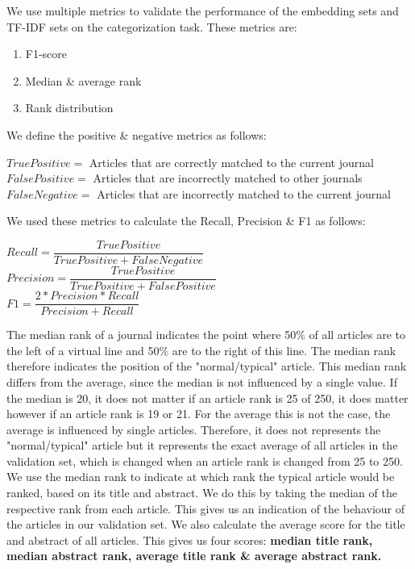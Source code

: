 \documentclass[../../Thesis.tex]{subfiles}
\begin{document}
We use multiple metrics to validate the performance of the embedding sets and TF-IDF sets on the categorization task. These metrics are:
\begin{enumerate}
\item{F1-score}
\item{Median \& average rank}
\item{Rank distribution}
\end{enumerate}
We define the positive \& negative metrics as follows:\\
\begin{jumpin}
$True Positive = $ Articles that are correctly matched to the current journal\\
$False Positive = $ Articles that are incorrectly matched to other journals\\
$False Negative = $ Articles that are incorrectly matched to the current journal\\
\end{jumpin}
We used these metrics to calculate the Recall, Precision \& F1 as follows:\\
\begin{jumpin}
$Recall = \dfrac{True Positive}{True Positive + False Negative}$\vspace{0.1in}\\
$Precision = \dfrac{True Positive}{True Positive + False Positive}$\vspace{0.1in}\\
$F1 = \dfrac{2 * Precision * Recall}{Precision + Recall}$
\end{jumpin}
The median rank of a journal indicates the point where 50\% of all articles are to the left of a virtual line and 50\% are to the right of this line. The median rank therefore indicates the position of the "normal/typical"  article. This median rank differs from the average, since the median is not influenced by a single value. If the median is 20, it does not matter if an article rank is 25 of 250, it does matter however if an article rank is 19 or 21. For the average this is not the case, the average is influenced by single articles. Therefore, it does not represents the "normal/typical" article but it represents the exact average of all articles in the validation set, which is changed when an article rank is changed from 25 to 250.\\
We use the median rank to indicate at which rank the typical article would be ranked, based on its title and abstract. We do this by taking the median of the respective rank from each article. This gives us an indication of the behaviour of the articles in our validation set. We also calculate the average score for the title and abstract of all articles. This gives us four scores: \textbf{median title rank, median abstract rank, average title rank \& average abstract rank.}
\end{document}

